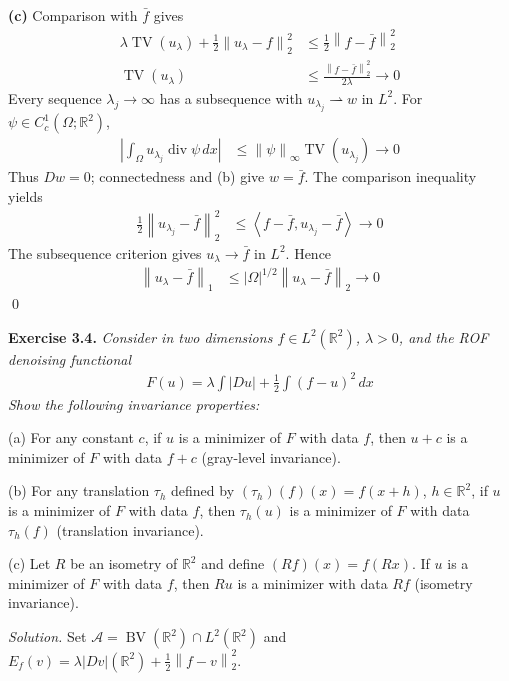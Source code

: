 \documentclass[12pt,letterpaper]{article}
\newcommand{\R}{\mathbb R}
\newcommand{\TV}{\operatorname{TV}}
\newcommand{\BV}{\operatorname{BV}}
\newcommand{\diver}{\operatorname{div}}
\newcommand{\dx}{\,dx}
\newcommand{\norm}[1]{\left\lVert #1\right\rVert}
\newcommand{\ip}[2]{\left\langle #1,#2\right\rangle}
\newcommand{\exercise}[1]{%
  \par\bigskip\noindent\textbf{Exercise #1.}\enspace}
\newenvironment{statement}{\itshape\ignorespaces}{\par}
\newcommand{\solution}{\par\medskip\noindent\textit{Solution.}\enspace}
\newcommand{\partlabel}[1]{\par\medskip\noindent\textbf{(#1)}\enspace}
\newcommand{\finish}{\qed\par}
\begin{document}
\partlabel{c} Comparison with $\bar f$ gives
\begin{align*}
 \lambda\TV(u_\lambda)+\frac12\norm{u_\lambda-f}_2^2
 &\leq\frac12\norm{f-\bar f}_2^2\\
 \TV(u_\lambda)&\leq\frac{\norm{f-\bar f}_2^2}{2\lambda}
 \longrightarrow0
\end{align*}
Every sequence $\lambda_j\to\infty$ has a subsequence with
$u_{\lambda_j}\rightharpoonup w$ in $L^2$. For
$\psi\in C_c^1(\Omega;\R^2)$,
\begin{align*}
 \left|\int_\Omega u_{\lambda_j}\diver\psi\dx\right|
 &\leq\norm\psi_\infty\TV(u_{\lambda_j})\longrightarrow0
\end{align*}
Thus $Dw=0$; connectedness and (b) give $w=\bar f$.
The comparison inequality yields
\begin{align*}
 \frac12\norm{u_{\lambda_j}-\bar f}_2^2
 &\leq\ip{f-\bar f}{u_{\lambda_j}-\bar f}\longrightarrow0
\end{align*}
The subsequence criterion gives $u_\lambda\to\bar f$ in $L^2$.
Hence
\begin{align*}
 \norm{u_\lambda-\bar f}_1
 &\leq|\Omega|^{1/2}\norm{u_\lambda-\bar f}_2\longrightarrow0
\end{align*}
\finish


\begin{samepage}
\exercise{3.4}
\begin{statement}
Consider in two dimensions $f\in L^2(\R^2)$, $\lambda>0$, and the ROF
denoising functional
\begin{align*}
 F(u)=\lambda\int |Du|+\frac12\int(f-u)^2\dx
\end{align*}
Show the following invariance properties:
\par\smallskip
(a) For any constant $c$, if $u$ is a minimizer of $F$ with data $f$,
then $u+c$ is a minimizer of $F$ with data $f+c$ (gray-level invariance).
\par\smallskip
(b) For any translation $\tau_h$ defined by
$(\tau_h)(f)(x)=f(x+h)$, $h\in\R^2$, if $u$ is a minimizer of $F$
with data $f$, then $\tau_h(u)$ is a minimizer of $F$ with data
$\tau_h(f)$ (translation invariance).
\par\smallskip
(c) Let $R$ be an isometry of $\R^2$ and define $(Rf)(x)=f(Rx)$.
If $u$ is a minimizer of $F$ with data $f$, then $Ru$ is a minimizer
with data $Rf$ (isometry invariance).
\end{statement}
\end{samepage}

\solution
Set $\mathcal A=\BV(\R^2)\cap L^2(\R^2)$ and
$E_f(v)=\lambda|Dv|(\R^2)+\frac12\norm{f-v}_2^2$.
\end{document}
